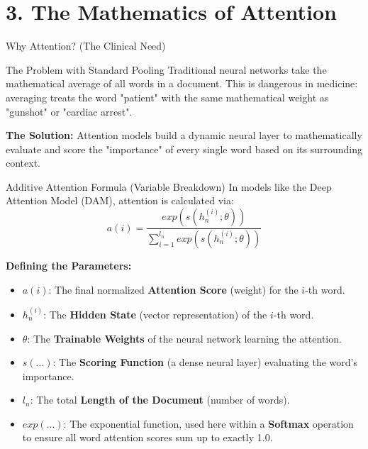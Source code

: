 \documentclass[aspectratio=169]{beamer}
\begin{document}
	\section{3. The Mathematics of Attention}
	
	\begin{frame}{Why Attention? (The Clinical Need)}
		\begin{block}{The Problem with Standard Pooling}
			Traditional neural networks take the mathematical average of all words in a document. This is dangerous in medicine: averaging treats the word "patient" with the same mathematical weight as "gunshot" or "cardiac arrest".
		\end{block}
		\vspace{0.3cm}
		\textbf{The Solution:} Attention models build a dynamic neural layer to mathematically evaluate and score the "importance" of every single word based on its surrounding context.
	\end{frame}
	
	\begin{frame}{Additive Attention Formula (Variable Breakdown)}
		In models like the Deep Attention Model (DAM), attention is calculated via:
		$$a(i)=\frac{exp(s(h_{n}^{(i)};\theta))}{\sum_{i=1}^{l_{n}}exp(s(h_{n}^{(i)};\theta))}$$ 
		
		\textbf{Defining the Parameters:}
		\begin{itemize}
			\item $a(i)$: The final normalized \textbf{Attention Score} (weight) for the $i$-th word.
			\item $h_{n}^{(i)}$: The \textbf{Hidden State} (vector representation) of the $i$-th word.
			\item $\theta$: The \textbf{Trainable Weights} of the neural network learning the attention.
			\item $s(...)$: The \textbf{Scoring Function} (a dense neural layer) evaluating the word's importance.
			\item $l_n$: The total \textbf{Length of the Document} (number of words).
			\item $exp(...)$: The exponential function, used here within a \textbf{Softmax} operation to ensure all word attention scores sum up to exactly 1.0.
		\end{itemize}
	\end{frame}
	
\end{document}

